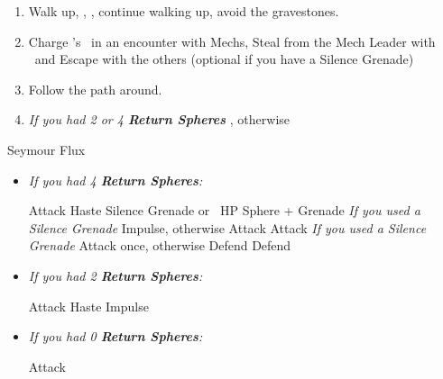 \begin{enumerate}[resume]
    \item Walk up, \sd, \cs[1:20], continue walking up, avoid the gravestones.
    \item Charge \rikku's \od\ in an encounter with Mechs, Steal from the Mech Leader with \rikku\ and Escape with the others (optional if you have a Silence Grenade)
    \item Follow the path around.
    \item \textit{If you had 2 or 4 \textbf{Return Spheres}} \formation{\tidus}{\yuna}{\auron}, otherwise \formation{\tidus}{\kimahri}{\wakka}
\end{enumerate}
\begin{battle}[70000]{Seymour Flux}
    \begin{itemize}
        \item \textit{If you had 4 \textbf{Return Spheres}:}
            \begin{itemize}
                \yunaf Attack
                \tidusf Haste \yuna
                \switch{\auron}{\rikku}
                \rikkuf Silence Grenade or \od\ HP Sphere + Grenade
                \summon{\bahamut}
                \bahamutf \textit{If you used a Silence Grenade} Impulse, otherwise Attack
                \yunaf Attack
                \tidusf \textit{If you used a Silence Grenade} Attack once, otherwise Defend
                \rikkuf Defend
            \end{itemize}
        \item \textit{If you had 2 \textbf{Return Spheres}:}
            \begin{itemize}
                \yunaf Attack
                \tidusf Haste \yuna
                \summon{\bahamut}
                \bahamutf Impulse
            \end{itemize}        
        \item \textit{If you had 0 \textbf{Return Spheres}:}
            \begin{itemize}
                \switch{\tidus}{\yuna}
                \summon{\bahamut}
                \bahamutf Attack
            \end{itemize}
    \end{itemize}
\end{battle}
